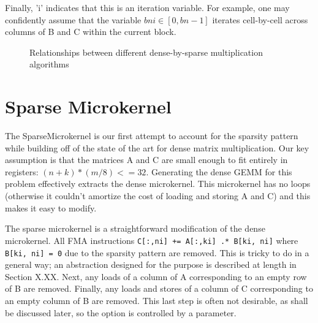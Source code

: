 Finally, 'i' indicates that this is an iteration variable.
For example, one may confidently assume that the variable $bni \in [0, bn-1]$ iterates cell-by-cell across columns of B and C within the current block.



\begin{figure}[H]
  \centering
  
  \label{fig:dxspfamilies}
  \caption{Relationships between different dense-by-sparse multiplication algorithms}
\end{figure}





\section{Sparse Microkernel}

The SparseMicrokernel is our first attempt to account for the sparsity pattern while building off of the state of the art for dense matrix multiplication. Our key assumption is that the matrices A and C are small enough to fit entirely in registers: $(n + k) * (m/8) <= 32$. Generating the dense GEMM for this problem effectively extracts the dense microkernel. This microkernel has no loops (otherwise it couldn't amortize the cost of loading and storing A and C) and this makes it easy to modify.

The sparse microkernel is a straightforward modification of the dense microkernel. All FMA instructions \texttt{C[:,ni] += A[:,ki] .* B[ki, ni]} where \texttt{B[ki, ni] = 0} due to the sparsity pattern are removed. This is tricky to do in a general way; an abstraction designed for the purpose is described at length in Section X.XX. Next, any loads of a column of A corresponding to an empty row of B are removed. Finally, any loads and stores of a column of C corresponding to an empty column of B are removed. This last step is often not desirable, as shall be discussed later, so the option is controlled by a parameter.

